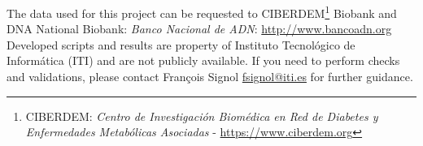 \label{availability}
The data used for this project can be requested to CIBERDEM\footnote{CIBERDEM: \emph{Centro de Investigación Biomédica en Red de Diabetes y Enfermedades Metabólicas Asociadas} - \url{https://www.ciberdem.org}} Biobank and DNA National Biobank: \emph{Banco Nacional de ADN}: \url{http://www.bancoadn.org}
\\

Developed scripts and results are property of Instituto Tecnológico de Informática (ITI) and are not publicly available. If you need to perform checks and validations, please contact François Signol \href{mailto:fsignol@iti.es}{fsignol@iti.es} for further guidance.